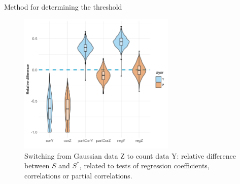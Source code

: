 \documentclass[9pt]{beamer}
\begin{document}
\begin{frame}{Method for determining the threshold}
\begin{figure}
    \centering
   \includegraphics[width=7.5cm]{diff_estim_density.png}   
    \caption{Switching from Gaussian data Z to count data Y: relative difference between $S$ and $S^*$, related to tests of regression coefficients, correlations or partial correlations.}
\end{figure}
\end{frame}

\subsection{}
\end{document}
